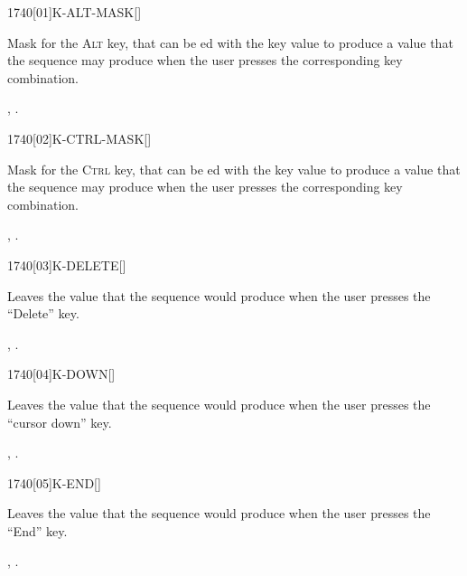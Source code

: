 
\vspace*{-2ex}
\begin{worddef}{1740}[01]{K-ALT-MASK}[]%
\item {}

	Mask for the \textsc{Alt} key, that can be ed with the
	key value to produce a value that the sequence 
	 may produce when the user presses the
	corresponding key combination.

\see {},
	.
\end{worddef}


\vspace*{-2ex}
\enlargethispage{4ex}
\begin{worddef}{1740}[02]{K-CTRL-MASK}[]%
\item {}

	Mask for the \textsc{Ctrl} key, that can be ed with the
	key value to produce a value that the sequence 
	 may produce when the user presses the
	corresponding key combination.

\see {},
	.
\end{worddef}


\begin{worddef}{1740}[03]{K-DELETE}[]%
\item {}

	Leaves the value  that the sequence 
	 would produce when the user presses the
	``Delete'' key.

\see {},
	.
\end{worddef}


\begin{worddef}{1740}[04]{K-DOWN}[]%
\item {}

	Leaves the value  that the sequence 
	 would produce when the user presses the
	``cursor down'' key.

\see {},
	.
\end{worddef}


\begin{worddef}{1740}[05]{K-END}[]%
\item {}

	Leaves the value  that the sequence 
	 would produce when the user presses the
	``End'' key.

\see {},
	.
\end{worddef}


